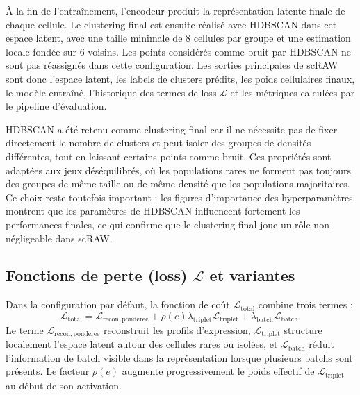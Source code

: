 À la fin de l'entraînement, l'encodeur produit la représentation latente finale de chaque cellule. Le clustering final est ensuite réalisé avec HDBSCAN dans cet espace latent, avec une taille minimale de 8 cellules par groupe et une estimation locale fondée sur 6 voisins. Les points considérés comme bruit par HDBSCAN ne sont pas réassignés dans cette configuration. Les sorties principales de scRAW sont donc l'espace latent, les labels de clusters prédits, les poids cellulaires finaux, le modèle entraîné, l'historique des termes de loss \(\mathcal{L}\) et les métriques calculées par le pipeline d'évaluation.

HDBSCAN a été retenu comme clustering final car il ne nécessite pas de fixer directement le nombre de clusters et peut isoler des groupes de densités différentes, tout en laissant certains points comme bruit. Ces propriétés sont adaptées aux jeux déséquilibrés, où les populations rares ne forment pas toujours des groupes de même taille ou de même densité que les populations majoritaires. Ce choix reste toutefois important : les figures d'importance des hyperparamètres montrent que les paramètres de HDBSCAN influencent fortement les performances finales, ce qui confirme que le clustering final joue un rôle non négligeable dans scRAW.

\subsection{\texorpdfstring{Fonctions de perte (loss) \(\mathcal{L}\) et variantes}{Fonctions de perte loss L et variantes}}

Dans la configuration par défaut, la fonction de coût \(\mathcal{L}_{\mathrm{total}}\) combine trois termes :
\begin{equation}
  \mathcal{L}_{\mathrm{total}}
  =
  \mathcal{L}_{\mathrm{recon,ponderee}}
  +
  \rho(e)\lambda_{\mathrm{triplet}}\mathcal{L}_{\mathrm{triplet}}
  +
  \lambda_{\mathrm{batch}}\mathcal{L}_{\mathrm{batch}}.
  \label{eq:loss_total}
\end{equation}
Le terme \(\mathcal{L}_{\mathrm{recon,ponderee}}\) reconstruit les profils d'expression, \(\mathcal{L}_{\mathrm{triplet}}\) structure localement l'espace latent autour des cellules rares ou isolées, et \(\mathcal{L}_{\mathrm{batch}}\) réduit l'information de batch visible dans la représentation lorsque plusieurs batchs sont présents. Le facteur \(\rho(e)\) augmente progressivement le poids effectif de \(\mathcal{L}_{\mathrm{triplet}}\) au début de son activation.

